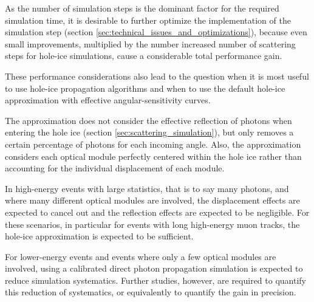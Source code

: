 As the number of simulation steps is the dominant factor for the required simulation time, it is desirable to further optimize the implementation of the simulation step (section \ref{sec:technical_issues_and_optimizations}), because even small improvements, multiplied by the number increased number of scattering steps for hole-ice simulations, cause a considerable total performance gain.\followup

These performance considerations also lead to the question when it is most useful to use hole-ice propagation algorithms and when to use the default hole-ice approximation with effective angular-sensitivity curves.

The approximation does not consider the effective reflection of photons when entering the hole ice (section \ref{sec:scattering_simulation}), but only removes a certain percentage of photons for each incoming angle. Also, the approximation considers each optical module perfectly centered within the hole ice rather than accounting for the individual displacement of each module.

In high-energy events with large statistics, that is to say many photons, and where many different optical modules are involved, the displacement effects are expected to cancel out and the reflection effects are expected to be negligible. For these scenarios, in particular for events with long high-energy muon tracks, the hole-ice approximation is expected to be sufficient.

For lower-energy events and events where only a few optical modules are involved, using a calibrated direct photon propagation simulation is expected to reduce simulation systematics. Further studies, however, are required to quantify this reduction of systematics, or equivalently to quantify the gain in precision.\followup

